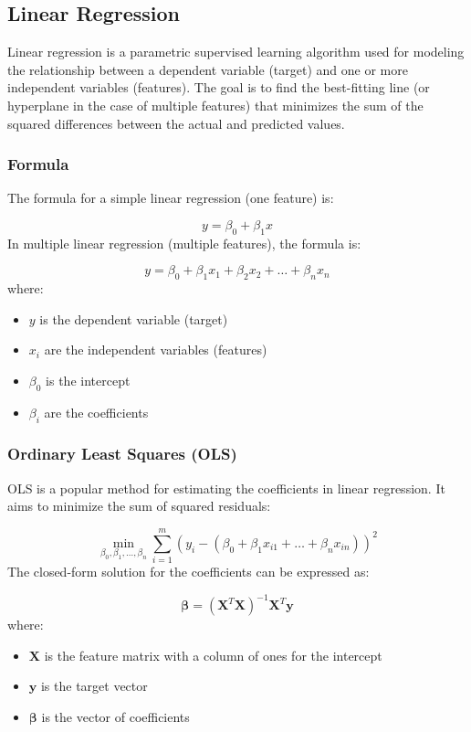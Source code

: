 \documentclass[12pt]{article}
\begin{document}
\subsection{Linear Regression}

Linear regression is a parametric supervised learning algorithm used for modeling the relationship between a dependent variable (target) and one or more independent variables (features). The goal is to find the best-fitting line (or hyperplane in the case of multiple features) that minimizes the sum of the squared differences between the actual and predicted values.

\subsubsection{Formula}

The formula for a simple linear regression (one feature) is:

$$ y = \beta_0 + \beta_1 x $$
In multiple linear regression (multiple features), the formula is:

$$y = \beta_0 + \beta_1 x_1 + \beta_2 x_2 + \dots + \beta_n x_n $$
where:
\begin{itemize}
\item $y$ is the dependent variable (target)
\item $x_i$ are the independent variables (features)
\item $\beta_0$ is the intercept
\item $\beta_i$ are the coefficients
\end{itemize}

\subsubsection{Ordinary Least Squares (OLS)}

OLS is a popular method for estimating the coefficients in linear regression. It aims to minimize the sum of squared residuals:

$$ \min_{\beta_0, \beta_1, \dots, \beta_n} \sum_{i=1}^m (y_i - (\beta_0 + \beta_1 x_{i1} + \dots + \beta_n x_{in}))^2$$
The closed-form solution for the coefficients can be expressed as:

$$ \boldsymbol{\beta} = (\mathbf{X}^T\mathbf{X})^{-1}\mathbf{X}^T\mathbf{y} $$
where:
\begin{itemize}
\item $\mathbf{X}$ is the feature matrix with a column of ones for the intercept
\item $\mathbf{y}$ is the target vector
\item $\boldsymbol{\beta}$ is the vector of coefficients
\end{itemize}
\end{document}
